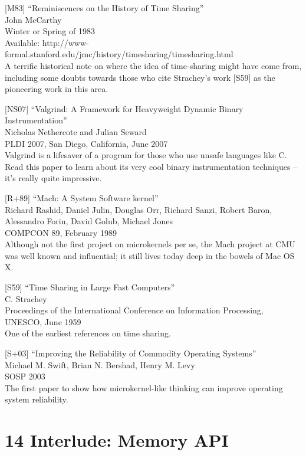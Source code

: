 {[}M83{]} ``Reminiscences on the History of Time Sharing''\\
John McCarthy\\
Winter or Spring of 1983\\
Available:
http://www-formal.stanford.edu/jmc/history/timesharing/timesharing.html\\
A terrific historical note on where the idea of time-sharing might have
come from, including some doubts towards those who cite Strachey's work
{[}S59{]} as the pioneering work in this area.

{[}NS07{]} ``Valgrind: A Framework for Heavyweight Dynamic Binary
Instrumentation''\\
Nicholas Nethercote and Julian Seward\\
PLDI 2007, San Diego, California, June 2007\\
Valgrind is a lifesaver of a program for those who use unsafe languages
like C. Read this paper to learn about its very cool binary
instrumentation techniques -- it's really quite impressive.

{[}R+89{]} ``Mach: A System Software kernel''\\
Richard Rashid, Daniel Julin, Douglas Orr, Richard Sanzi, Robert Baron,
Alessandro Forin, David Golub, Michael Jones\\
COMPCON 89, February 1989\\
Although not the first project on microkernels per se, the Mach project
at CMU was well known and influential; it still lives today deep in the
bowels of Mac OS X.

{[}S59{]} ``Time Sharing in Large Fast Computers''\\
C. Strachey\\
Proceedings of the International Conference on Information Processing,
UNESCO, June 1959\\
One of the earliest references on time sharing.

{[}S+03{]} ``Improving the Reliability of Commodity Operating
Systems''\\
Michael M. Swift, Brian N. Bershad, Henry M. Levy\\
SOSP 2003\\
The first paper to show how microkernel-like thinking can improve
operating system reliability.

\newpage

\hypertarget{interlude-memory-api}{%
\section*{14 Interlude: Memory API}\label{interlude-memory-api}}

